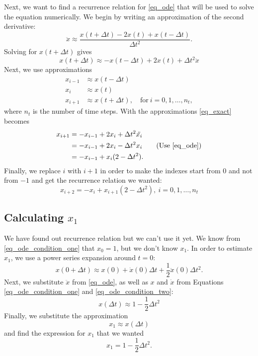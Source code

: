 Next, we want to find a recurrence relation for \autoref{eq_ode} that will be used to solve the equation numerically. We begin by writing an approximation of the second derivative:
\[
  \ddot{x} \approx \frac{x(t + \Delta t) - 2 x(t) + x(t - \Delta t)}{\Delta t^2}.
\]
Solving for $ x(t + \Delta t)$ gives
\begin{equation}
  x(t + \Delta t) \approx - x(t - \Delta t) + 2 x(t) + \Delta t^2 \ddot{x}
  \label{eq_exact}
\end{equation}
Next, we use approximations
\begin{align*}
  x_{i-1} &\approx x(t - \Delta t) \\
  x_{i} &\approx x(t) \\
  x_{i+1} &\approx x(t + \Delta t), \quad \textrm{for} \ i = 0, 1, \dots , n_t,
\end{align*}
where $n_t$ is the number of time steps.
With the approximations \autoref{eq_exact} becomes
\begin{align*}
  x_{i+1} &= - x_{i-1} + 2 x_{i} + \Delta t^2 \ddot{x_{i}} \\
    &= - x_{i-1} + 2 x_{i} - \Delta t^2 x_{i} \tag{Use \autoref{eq_ode}}\\
    &= - x_{i-1} + x_{i} (2 - \Delta t^2 ).
\end{align*}
Finally, we replace $i$ with $i+1$ in order to make the indexes start from $0$ and not from $-1$ and get the recurrence relation we wanted:
\begin{equation}
  \boxed{ x_{i+2} = - x_{i} + x_{i+1} (2 - \Delta t^2 ), \ i = 0, 1, \dots , n_t }
  \label{eq_reccurence_relation}
\end{equation}

\subsection{Calculating $x_1$}

We have found out recurrence relation but we can't use it yet. We know from \autoref{eq_ode_condition_one} that $x_0 = 1$, but we don't know $x_1$. In order to estimate $x_1$, we use a power series expansion around $t=0$:
\[
  x(0 + \Delta t) \approx x(0) + \dot{x}(0) \Delta t + \frac{1}{2} \ddot{x}(0) \Delta t^2.
\]
Next, we substitute $\ddot{x}$ from \autoref{eq_ode}, as well as $x$ and $\dot{x}$ from Equations \ref{eq_ode_condition_one} and \ref{eq_ode_condition_two}:
\[
  x(\Delta t) \approx 1 - \frac{1}{2} \Delta t^2
\]
Finally, we substitute the approximation
\[
  x_1 \approx x(\Delta t)
\]
and find the expression for $x_1$ that we wanted
\[
    \boxed{ x_1 = 1 - \frac{1}{2} \Delta t^2. }
\]


